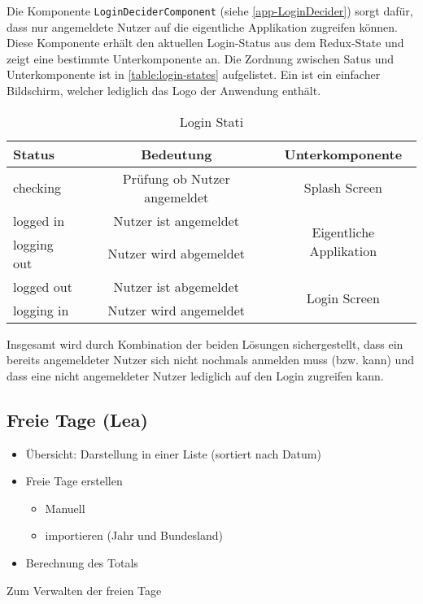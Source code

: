 

Die Komponente \texttt{LoginDeciderComponent} (siehe \autoref{app-LoginDecider}) sorgt dafür,
dass nur angemeldete Nutzer auf die eigentliche Applikation zugreifen können.
Diese Komponente erhält den aktuellen Login-Status aus dem Redux-State und zeigt eine bestimmte Unterkomponente an.
Die Zordnung zwischen Satus und Unterkomponente ist in \autoref{table:login-states} aufgelistet.
Ein  ist ein einfacher Bildschirm, welcher lediglich das Logo der Anwendung enthält.

\begin{table}[h!]
    \centering
     \begin{tabular}{| l | c | c |}
        \hline
        Status      & Bedeutung                      & Unterkomponente \\
        \hline\hline
        checking    & Prüfung ob Nutzer angemeldet   & Splash Screen\\
        \hline
        logged in   & Nutzer ist angemeldet          & \multirow{2}{*}{Eigentliche Applikation}\\
        \cline{1-2}
        logging out & Nutzer wird abgemeldet         & \\
        \hline
        logged out  & Nutzer ist abgemeldet          & \multirow{2}{*}{Login Screen} \\
        \cline{1-2}
        logging in  & Nutzer wird angemeldet         & \\
        \hline
     \end{tabular}
     \caption{Login Stati}
     \label{table:login-states}
\end{table}

Insgesamt wird durch Kombination der beiden Lösungen sichergestellt,
dass ein bereits angemeldeter Nutzer sich nicht nochmals anmelden muss (bzw. kann)
und dass eine nicht angemeldeter Nutzer lediglich auf den Login zugreifen kann.

\subsection{Freie Tage (Lea)}
\begin{itemize}
    \item Übersicht: Darstellung in einer Liste (sortiert nach Datum)
    \item Freie Tage erstellen 
    \begin{itemize}
        \item Manuell
        \item importieren (Jahr und Bundesland)
    \end{itemize}
    \item Berechnung des Totals 
\end{itemize}
Zum Verwalten der freien Tage


